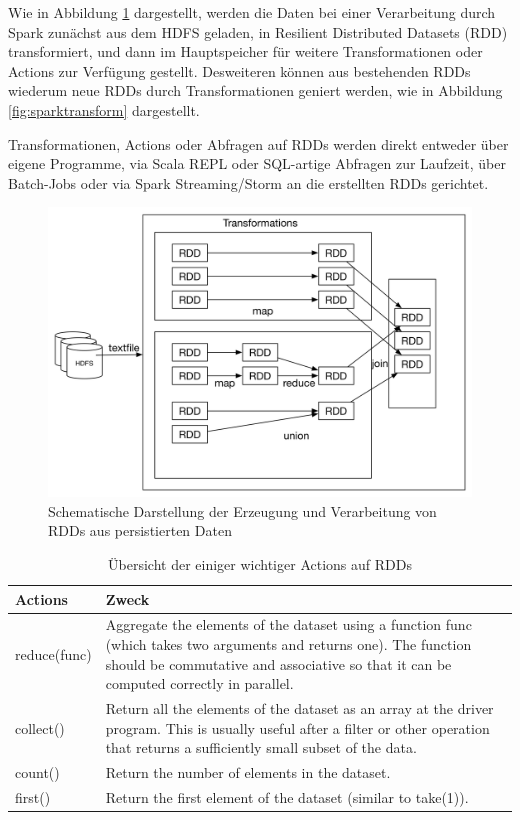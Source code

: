 Wie in Abbildung \ref{fig:rddunkt} dargestellt, werden die Daten bei einer Verarbeitung durch Spark zunächst aus dem HDFS geladen, in Resilient Distributed Datasets (RDD) transformiert, und dann im Hauptspeicher für weitere Transformationen oder Actions zur Verfügung gestellt. Desweiteren können aus bestehenden RDDs wiederum neue RDDs durch Transformationen geniert werden, wie in Abbildung \ref{fig:sparktransform} dargestellt. 

Transformationen, Actions oder Abfragen auf RDDs werden direkt entweder über eigene Programme, via Scala REPL oder SQL-artige Abfragen zur Laufzeit, über Batch-Jobs oder via Spark Streaming/Storm an die erstellten RDDs gerichtet.

\begin{figure}[htb!]
\centering
\includegraphics[width=1.0\textwidth]{bilder/rdd_transform.png}
\caption{Schematische Darstellung der Erzeugung und Verarbeitung von RDDs aus persistierten Daten}
\label{fig:rddunkt}
\end{figure}




\begin{table}[!ht]
\centering
\begin{tabular}{| p{5cm} | p{8cm} | }
\hline
Actions & Zweck \\ \hline \hline
reduce(func) & Aggregate the elements of the dataset using a function func (which takes two arguments and returns one). The function should be commutative and associative so that it can be computed correctly in parallel.  \\ \hline 
collect() & Return all the elements of the dataset as an array at the driver program. This is usually useful after a filter or other operation that returns a sufficiently small subset of the data. \\ \hline 
count() & Return the number of elements in the dataset. \\ \hline 
first() & Return the first element of the dataset (similar to take(1)). \\ \hline 
\end{tabular}
\caption{Übersicht der einiger wichtiger Actions auf RDDs}
	\label{tab:actions}
\end{table}

